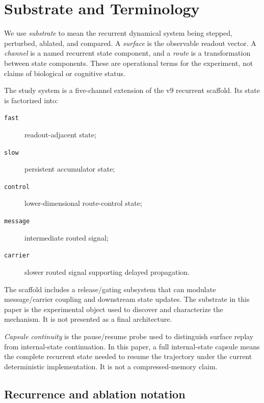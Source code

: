 \documentclass[11pt]{article}
\begin{document}
\section{Substrate and Terminology}

We use \emph{substrate} to mean the recurrent dynamical system being stepped,
perturbed, ablated, and compared. A \emph{surface} is the observable readout
vector. A \emph{channel} is a named recurrent state component, and a
\emph{route} is a transformation between state components. These are
operational terms for the experiment, not claims of biological or cognitive
status.

The study system is a five-channel extension of the v9 recurrent scaffold. Its
state is factorized into:

\begin{description}
  \item[\texttt{fast}] readout-adjacent state;
  \item[\texttt{slow}] persistent accumulator state;
  \item[\texttt{control}] lower-dimensional route-control state;
  \item[\texttt{message}] intermediate routed signal;
  \item[\texttt{carrier}] slower routed signal supporting delayed
  propagation.
\end{description}

The scaffold includes a release/gating subsystem that can modulate
message/carrier coupling and downstream state updates. The substrate in this
paper is the experimental object used to discover and characterize the
mechanism. It is not presented as a final architecture.

\emph{Capsule continuity} is the pause/resume probe used to distinguish
surface replay from internal-state continuation. In this paper, a full
internal-state capsule means the complete recurrent state needed to resume the
trajectory under the current deterministic implementation. It is not a
compressed-memory claim.

\subsection{Recurrence and ablation notation}
\end{document}
